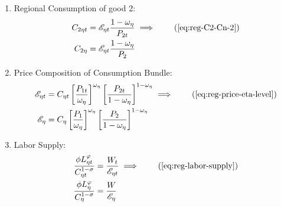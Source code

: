 \documentclass[
thesis.tex
]{subfiles}
\begin{document}
\begin{enumerate}
	\item Regional Consumption of good 2:
	\begin{align}
		C_{2\eta t} &= \te \frac{1 -\omega_{\eta}}{P_{2t}} \implies \tag{\ref{eq:reg-C2-Cn-2}} \\
		C_{2\eta} &= \te \frac{1 -\omega_{\eta}}{P_{2}} \label{eq:reg-ss-C2-Cn-2}
	\end{align}

\begin{comment}
	\item Regional Consumption:
	\begin{align}
		C_{\eta t} &= C_{1\eta t}^{\omega_{\eta}} C_{2\eta t}^{1-\omega_{\eta}} \implies \tag{\ref{eq:reg-consumption-aggregation}} \\
		C_{\eta} &= C_{1\eta}^{\omega_{\eta}} C_{2\eta}^{1-\omega_{\eta}} \label{eq:reg-ss-consumption-aggregation}
	\end{align}
	
	\item Relative Consumption of Regional Goods:
	\begin{align}
		\frac{C_{1\eta t}}{C_{2\eta t}} &= \frac{P_{2t}}{P_{1t}} \cdot \frac{\omega_{\eta}}{1 -\omega_{\eta}} \implies \tag{\ref{eq:reg-FOC-C1-C2}}\\
		\frac{C_{1\eta}}{C_{2\eta}} &= \frac{P_{2}}{P_{1}} \cdot \frac{\omega_{\eta}}{1 -\omega_{\eta}} \label{eq:reg-ss-FOC-C1-C2}
	\end{align}
	
\end{comment}

	\item Price Composition of Consumption Bundle:
	\begin{align}
		\te &= C_{\eta t} \left[ \frac{P_{1t}}{\omega_{\eta}} \right]^{\omega_{\eta}} \left[ \frac{P_{2t}}{1 -\omega_{\eta}} \right]^{1 -\omega_{\eta}} \implies \tag{\ref{eq:reg-price-eta-level}} 
		\\
		\te[] &= C_{\eta} \left[ \frac{P_{1}}{\omega_{\eta}} \right]^{\omega_{\eta}} \left[ \frac{P_{2}}{1 -\omega_{\eta}} \right]^{1 -\omega_{\eta}} \label{eq:reg-ss-price-eta-level}
	\end{align}

	\item Labor Supply:
	\begin{align}
		\frac{\phi L_{\eta t}^{\varphi}}{C_{\eta t}^{1-\sigma}} &= \frac{W_t}{\te} \implies \tag{\ref{eq:reg-labor-supply}} \\
		\frac{\phi L_{\eta}^{\varphi}}{C_{\eta}^{1-\sigma}} &= \frac{W}{\te[]} \label{eq:reg-ss-household-labor-supply}
	\end{align}


\end{enumerate}
\end{document}
